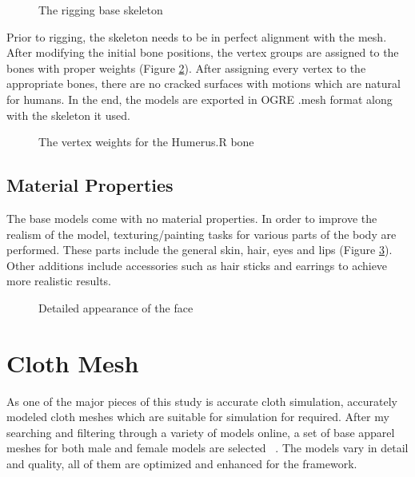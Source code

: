 \begin{figure}[h]
\centerline{}
\caption{The rigging base skeleton}
\label{fig:rigging_skeleton}
\end{figure}

Prior to rigging, the skeleton needs to be in perfect alignment with the mesh. After modifying the initial bone positions, the vertex groups are assigned to the bones with proper weights (Figure \ref{fig:weight_humerus_r}).
After assigning every vertex to the appropriate bones, there are no cracked surfaces with motions which are natural for humans. In the end, the models are exported in OGRE .mesh format along with the skeleton it used.

\begin{figure}[h]
\centerline{}
\caption{The vertex weights for the Humerus.R bone}
\label{fig:weight_humerus_r}
\end{figure}

\subsection{Material Properties}

The base models come with no material properties. In order to improve the realism of the model, texturing/painting tasks for various parts of the body are performed. These parts include the general skin, hair, eyes and lips (Figure \ref{fig:detailed_face}). Other additions include accessories such as hair sticks and earrings to achieve more realistic results.

\begin{figure}[h]
\centerline{}
\caption{Detailed appearance of the face}
\label{fig:detailed_face}
\end{figure}

\section{Cloth Mesh}
\label{section_cloth_mesh}

As one of the major pieces of this study is accurate cloth simulation, accurately modeled cloth meshes which are suitable for simulation for required. After my searching and filtering through a variety of models online, a set of base apparel meshes for both male and female models are selected ~\cite{LadyJewell2012, 3dregenerator2013,Axel2013,Borodin2013,PS3D2013,Alperin2013}. The models vary in detail and quality, all of them are optimized and enhanced for the framework. 

